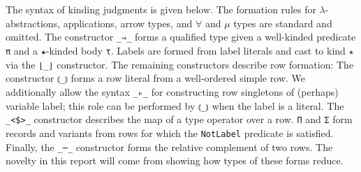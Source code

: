 \documentclass[authoryear, acmsmall, screen, review, nonacm]{acmart} %
\begin{document}
\begin{code}%
\>[0]\AgdaSpace{}%
\AgdaSpace{}%
\AgdaSpace{}%
\AgdaSpace{}%
\<%
\\
\>[0][@{}l@{\AgdaIndent{0}}]%
\>[2]\AgdaSpace{}%
\AgdaSymbol{:}\AgdaSpace{}%
\AgdaSymbol{(}\AgdaSpace{}%
\AgdaSpace{}%
\AgdaSpace{}%
\AgdaSymbol{:}\AgdaSpace{}%
\AgdaSpace{}%
\AgdaSpace{}%
\AgdaOperator{\AgdaInductiveConstructor{R[}}\AgdaSpace{}%
\AgdaSpace{}%
\AgdaOperator{\AgdaInductiveConstructor{]}}\AgdaSymbol{)}\AgdaSpace{}%
\AgdaSpace{}%
\AgdaSpace{}%
\AgdaSpace{}%
\AgdaSpace{}%
\AgdaOperator{\AgdaInductiveConstructor{R[}}\AgdaSpace{}%
\AgdaSpace{}%
\AgdaOperator{\AgdaInductiveConstructor{]}}\<%
\\
%
\>[2]\AgdaSpace{}%
\AgdaSymbol{:}\AgdaSpace{}%
\AgdaSymbol{(}\AgdaSpace{}%
\AgdaSpace{}%
\AgdaSymbol{:}\AgdaSpace{}%
\AgdaSpace{}%
\AgdaSpace{}%
\AgdaOperator{\AgdaInductiveConstructor{R[}}\AgdaSpace{}%
\AgdaSpace{}%
\AgdaOperator{\AgdaInductiveConstructor{]}}\AgdaSymbol{)}\AgdaSpace{}%
\AgdaSpace{}%
\AgdaSpace{}%
\AgdaSpace{}%
\AgdaSpace{}%
\AgdaOperator{\AgdaInductiveConstructor{R[}}\AgdaSpace{}%
\AgdaSpace{}%
\AgdaOperator{\AgdaInductiveConstructor{]}}\<%
\end{code}

The syntax of kinding judgments is given below. The formation rules for $\lambda$-abstractions, applications, arrow types, and $\forall$ and $\mu$ types are standard and omitted. The constructor \verb!_⇒_! forms a qualified type given a well-kinded predicate \verb!π! and a \verb!★!-kinded body \verb!τ!. Labels are formed from label literals and cast to kind $\star$ via the \verb!⌊_⌋! constructor. The remaining constructors describe row formation: The constructor \verb!⦅_⦆! forms a row literal from a well-ordered simple row. We additionally allow the syntax \verb!_▹_! for constructing row singletons of (perhaps) variable label; this role can be performed by \verb!⦅_⦆! when the label is a literal. The \verb!_<$>_! constructor describes the map of a type operator over a row. \verb!Π! and \verb!Σ! form records and variants from rows for which the \verb!NotLabel! predicate is satisfied. Finally, the \verb!_─_! constructor forms the relative complement of two rows. The novelty in this report will come from showing how types of these forms reduce.
\end{document}
